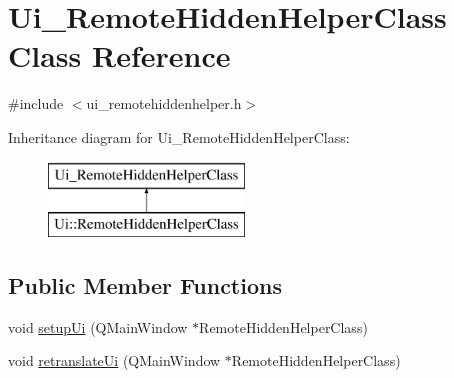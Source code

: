 \hypertarget{class_ui___remote_hidden_helper_class}{}\section{Ui\+\_\+\+Remote\+Hidden\+Helper\+Class Class Reference}
\label{class_ui___remote_hidden_helper_class}


{\ttfamily \#include $<$ui\+\_\+remotehiddenhelper.\+h$>$}

Inheritance diagram for Ui\+\_\+\+Remote\+Hidden\+Helper\+Class\+:\begin{figure}[H]
\begin{center}
\leavevmode
\includegraphics[height=2.000000cm]{class_ui___remote_hidden_helper_class}
\end{center}
\end{figure}
\subsection*{Public Member Functions}
\begin{DoxyCompactItemize}
\item 
void \hyperlink{class_ui___remote_hidden_helper_class_acdd6f5a5bebf921d5fcec8489a3fff1e}{setup\+Ui} (Q\+Main\+Window $\ast$Remote\+Hidden\+Helper\+Class)
\item 
void \hyperlink{class_ui___remote_hidden_helper_class_a393b3811be6e056a98239ede71c80ec9}{retranslate\+Ui} (Q\+Main\+Window $\ast$Remote\+Hidden\+Helper\+Class)
\end{DoxyCompactItemize}
